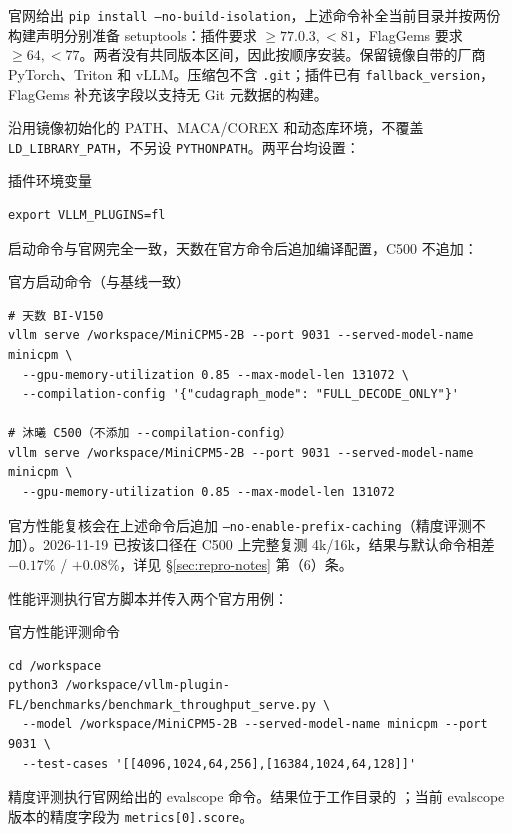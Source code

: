 \documentclass[11pt,a4paper]{ctexart}
\newcommand{\secref}[1]{\S\ref{#1}}
\begin{document}
官网给出 \texttt{pip install --no-build-isolation}，上述命令补全当前目录并按两份构建声明分别准备 setuptools：插件要求 $\ge77.0.3,<81$，FlagGems 要求 $\ge64,<77$。两者没有共同版本区间，因此按顺序安装。保留镜像自带的厂商 PyTorch、Triton 和 vLLM。压缩包不含 \texttt{.git}；插件已有 \texttt{fallback\_version}，FlagGems 补充该字段以支持无 Git 元数据的构建。

沿用镜像初始化的 PATH、MACA/COREX 和动态库环境，不覆盖 \texttt{LD\_LIBRARY\_PATH}，不另设 \texttt{PYTHONPATH}。两平台均设置：

\begin{reportcode}{插件环境变量}
\begin{verbatim}
export VLLM_PLUGINS=fl
\end{verbatim}
\end{reportcode}

启动命令与官网完全一致，天数在官方命令后追加编译配置，C500 不追加：
\begin{reportcode}{官方启动命令（与基线一致）}
\begin{verbatim}
# 天数 BI-V150
vllm serve /workspace/MiniCPM5-2B --port 9031 --served-model-name minicpm \
  --gpu-memory-utilization 0.85 --max-model-len 131072 \
  --compilation-config '{"cudagraph_mode": "FULL_DECODE_ONLY"}'

# 沐曦 C500（不添加 --compilation-config）
vllm serve /workspace/MiniCPM5-2B --port 9031 --served-model-name minicpm \
  --gpu-memory-utilization 0.85 --max-model-len 131072
\end{verbatim}
\end{reportcode}

官方性能复核会在上述命令后追加 \texttt{--no-enable-prefix-caching}（精度评测不加）。2026-11-19 已按该口径在 C500 上完整复测 4k/16k，结果与默认命令相差 $-0.17\%$ / $+0.08\%$，详见 \secref{sec:repro-notes} 第（6）条。

性能评测执行官方脚本并传入两个官方用例：

\begin{reportcode}{官方性能评测命令}
\begin{verbatim}
cd /workspace
python3 /workspace/vllm-plugin-FL/benchmarks/benchmark_throughput_serve.py \
  --model /workspace/MiniCPM5-2B --served-model-name minicpm --port 9031 \
  --test-cases '[[4096,1024,64,256],[16384,1024,64,128]]'
\end{verbatim}
\end{reportcode}

精度评测执行官网给出的 evalscope 命令。结果位于工作目录的 ；当前 evalscope 版本的精度字段为 \texttt{metrics[0].score}。
\end{document}
